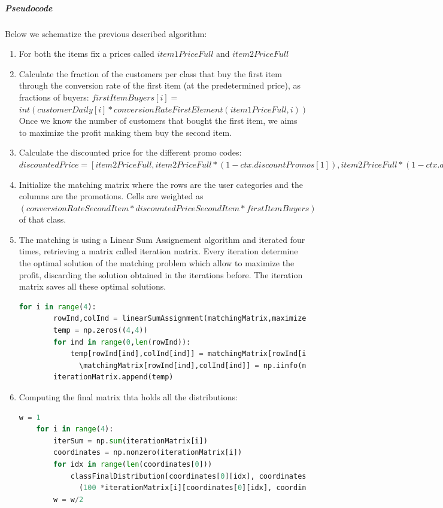 \subparagraph*{Pseudocode}
Below we schematize the previous described algorithm:\\
\begin{enumerate}
	\item For both the items fix a prices called $item1PriceFull$ and $item2PriceFull$
	\item Calculate the fraction of the customers per class that buy the first item through the conversion rate of the first item (at the predetermined price), as fractions of buyers: $firstItemBuyers[i]=$\\
	$int (customerDaily[i] * conversionRateFirstElement(item1PriceFull, i))$\\
	Once we know the number of customers that bought the first item, we aims to maximize the profit making them buy the second item.
	\item Calculate the discounted price for the different promo codes: $discountedPrice = [item2PriceFull, item2PriceFull*(1-ctx.discountPromos[1]),	item2PriceFull*(1-ctx.discountPromos[2]),item2PriceFull*(1-ctx.discountPromos[3])]$
	\item Initialize the matching matrix where the rows are the user categories and the columns are the promotions. Cells are weighted as $(conversionRateSecondItem * discountedPriceSecondItem * firstItemBuyers)$ of that class.
	\item The matching is using a Linear Sum Assignement algorithm and iterated four times, retrieving a matrix called iteration matrix. Every iteration determine the optimal solution of the matching problem which allow to maximize the profit, discarding the solution obtained in the iterations before. The iteration matrix saves all these optimal solutions.\\
	\begin{lstlisting}[basicstyle=\tiny\tt, tabsize=2, language=Python]
	for i in range(4):
		rowInd,colInd = linearSumAssignment(matchingMatrix,maximize=True)
		temp = np.zeros((4,4))
		for ind in range(0,len(rowInd)):
			temp[rowInd[ind],colInd[ind]] = matchingMatrix[rowInd[ind],colInd[ind]]
		  	  \matchingMatrix[rowInd[ind],colInd[ind]] = np.iinfo(np.int64).min
		iterationMatrix.append(temp)
	\end{lstlisting}

	\item Computing the final matrix thta holds all the distributions:\\
	\begin{lstlisting}[basicstyle=\tiny\tt, tabsize=2, language=Python]
	w = 1
	for i in range(4):
		iterSum = np.sum(iterationMatrix[i])
		coordinates = np.nonzero(iterationMatrix[i])
		for idx in range(len(coordinates[0]))
			classFinalDistribution[coordinates[0][idx], coordinates[1][idx]] = 
			  (100 *iterationMatrix[i][coordinates[0][idx], coordinates[1][idx]] /iterSum ) * w
		w = w/2
	\end{lstlisting}


\end{enumerate}
